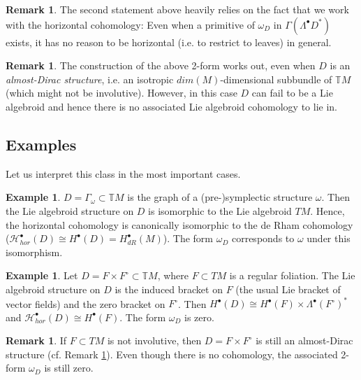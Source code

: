 \documentclass[a4paper,12pt]{amsart}
\theoremstyle{definition}
\newtheorem{Remark}[Definition]{Remark}
\newtheorem{Example}[Definition]{Example}
\begin{document}
\begin{Remark}
The second statement above heavily relies on the fact that we work with the  {horizontal} cohomology: Even when a primitive of $\omega_D$ in $\Gamma(\Lambda^\bullet D^*)$ exists, it has no reason to be horizontal (i.e. to restrict to leaves) in general.
\end{Remark}


\begin{Remark} \label{almost-dirac}
The construction of the above 2-form works out, even when $D$ is an \emph{almost-Dirac structure}, i.e. an isotropic $dim(M)$-dimensional subbundle of $\mathbb TM$ (which might not be involutive). However, in this case $D$ can fail to be a Lie algebroid and hence there is no associated Lie algebroid cohomology to lie in.
\end{Remark}


\subsection{Examples} \label{sec:examples}
Let us interpret this class in the most important cases.

\begin{Example} \label{sympl-ex}
$D=\Gamma_{\omega}\subset \mathbb TM$ is the graph of a (pre-)symplectic structure $\omega$. Then the Lie algebroid structure on $D$ is isomorphic to the Lie algebroid $TM$. Hence, the  {horizontal} cohomology is canonically isomorphic to the de Rham cohomology ($\mathcal{H}_{{hor}}^\bullet(D)\cong H^\bullet(D)=H^\bullet_{dR}(M)$). The form $\omega_D$ corresponds to $\omega$ under this isomorphism.
\end{Example}


\begin{Example}
\label{reg-fol}
Let $D=F\times F^\circ\subset \mathbb TM$, where $F\subset TM$ is a regular foliation. The Lie algebroid structure on $D$ is the induced bracket on $F$ (the usual Lie bracket of vector fields) and the zero bracket on $F^\circ$.
Then $H^\bullet(D)\cong H^\bullet(F)\times \Lambda^\bullet (F^\circ)^*$ and $\mathcal H^\bullet_{{hor}}(D)\cong H^\bullet(F)$. The form $\omega_D$ is zero.
\end{Example}

\begin{Remark} \label{almost-holonomic}
If $F\subset TM$ is not involutive, then $D=F\times F^\circ$ is still an almost-Dirac structure (cf. Remark \ref{almost-dirac}). Even though there is no cohomology, the associated 2-form $\omega_D$ is still zero. 
\end{Remark}
\end{document}
